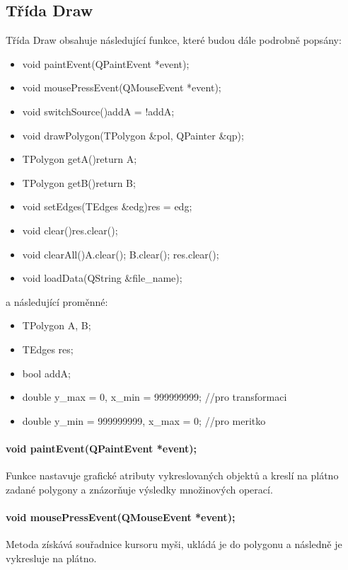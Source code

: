 \documentclass[11pt]{article}
\begin{document}
\subsection{Třída Draw}
Třída Draw obsahuje následující funkce, které budou dále podrobně popsány:

\begin{itemize}
\item void paintEvent(QPaintEvent *event);
\item void mousePressEvent(QMouseEvent *event);
\item void switchSource(){addA = !addA;}
\item void drawPolygon(TPolygon \&pol, QPainter \&qp);
\item TPolygon getA(){return A;}
\item TPolygon getB(){return B;}
\item void setEdges(TEdges \&edg){res = edg;}
\item void clear(){res.clear();}
\item void clearAll(){A.clear(); B.clear(); res.clear();}
\item void loadData(QString \&file\_name);
\end{itemize}

a následující proměnné:

\begin{itemize}

\item TPolygon A, B;
\item TEdges res;
\item bool addA;
\item double y\_max = 0, x\_min = 999999999; //pro transformaci
\item double y\_min = 999999999, x\_max = 0; //pro meritko
\end{itemize}

\paragraph{void paintEvent(QPaintEvent *event);}
Funkce nastavuje grafické atributy vykreslovaných objektů a kreslí na plátno zadané polygony a znázorňuje výsledky množinových operací.

\paragraph{void mousePressEvent(QMouseEvent *event);}
Metoda získává souřadnice kursoru myši, ukládá je do polygonu a následně je vykresluje na plátno.
\end{document}
